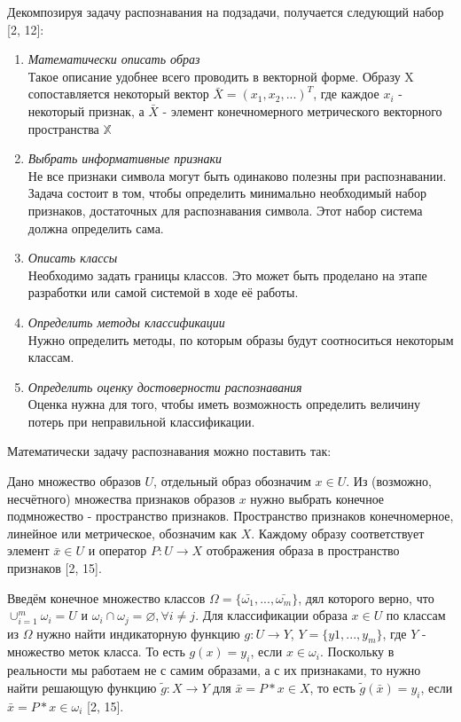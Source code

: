 Декомпозируя задачу распознавания на подзадачи, получается следующий набор [2, 12]:
\begin{enumerate}
    \item \textit{Математически описать образ}\\
        Такое описание удобнее всего проводить в векторной форме. Образу X сопоставляется некоторый вектор $\bar{X}=(x_1,x_2,...)^T$, где каждое $x_i$ - некоторый признак, а $\bar{X}$ - элемент конечномерного метрического векторного пространства $\mathbb{X}$
    \item \textit{Выбрать информативные признаки}\\
        Не все признаки символа могут быть одинаково полезны при распознавании. Задача состоит в том, чтобы определить минимально необходимый набор признаков, достаточных для распознавания символа. Этот набор система должна определить сама.
    \item \textit{Описать классы}\\
        Необходимо задать границы классов. Это может быть проделано на этапе разработки или самой системой в ходе её работы.
    \item \textit{Определить методы классификации}\\
        Нужно определить методы, по которым образы будут соотноситься некоторым классам.
    \item \textit{Определить оценку достоверности распознавания}\\
        Оценка нужна для того, чтобы иметь возможность определить величину потерь при неправильной классификации.
\end{enumerate}

Математически задачу распознавания можно поставить так:

Дано множество образов $U$, отдельный образ обозначим $x\in U$. Из (возможно, несчётного) множества признаков образов $x$ нужно выбрать конечное подмножество - пространство признаков. Пространство признаков конечномерное, линейное или метрическое, обозначим как $X$. Каждому образу соответствует элемент $\bar{x} \in U$ и оператор $P: U \longrightarrow X$ отображения образа в пространство признаков [2, 15].

Введём конечное множество классов $\Omega=\{\bar{\omega_1}, ..., \bar{\omega_m}\}$, дял которого верно, что $\cup_{i=1}^m\omega_i = U$ и $\omega_i \cap \omega_j = \varnothing, \forall i \not= j$. Для классификации образа $x \in U$ по классам из $\Omega$ нужно найти индикаторную функцию $g: U \longrightarrow Y$, $Y=\{y1, ..., y_m\}$, где $Y$ - множество меток класса. То есть $g(x)=y_i$, если $x \in \omega_i$. Поскольку в реальности мы работаем не с самим образами, а с их признаками, то нужно найти решающую функцию $\tilde{g}: X \longrightarrow Y$ для $\bar{x}=P*x \in X$, то есть $\tilde{g}(\bar{x})=y_i$, если $\bar{x}=P*x \in \omega_i$ [2, 15].

